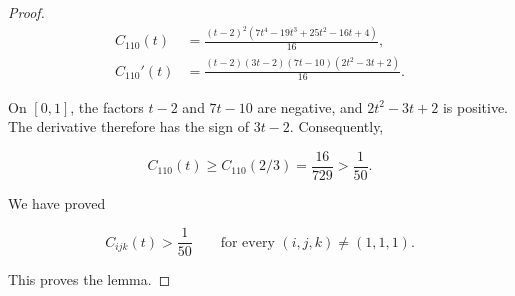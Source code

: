\documentclass[10pt,a4paper]{amsart}
\begin{document}
\begin{proof}
\[
\begin{aligned}
C_{110}(t)
&=\frac{(t-2)^2(7t^4-19t^3+25t^2-16t+4)}{16},\\
C_{110}'(t)
&=\frac{(t-2)(3t-2)(7t-10)(2t^2-3t+2)}{16}.
\end{aligned}                                             \tag{4.4}
\]

On \([0,1]\), the factors \(t-2\) and \(7t-10\) are negative, and
\(2t^2-3t+2\) is positive. The derivative therefore has the sign of
\(3t-2\). Consequently,

\[
C_{110}(t)\ge C_{110}(2/3)=\frac{16}{729}>\frac1{50}.
\]

We have proved

\[
C_{ijk}(t)>\frac1{50}
\qquad\text{for every }(i,j,k)\ne(1,1,1).
\]

This proves the lemma.
\end{proof}
\end{document}
